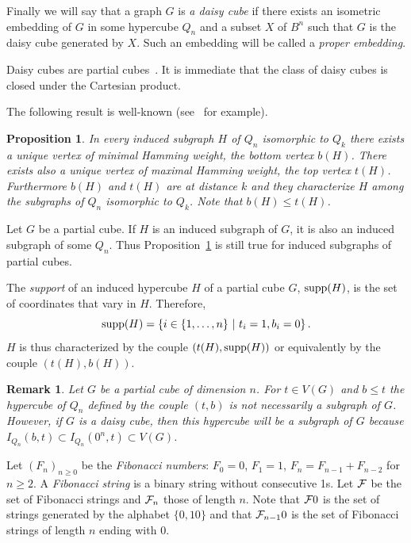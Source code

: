 \documentclass[11pt]{article}
\newtheorem{proposition}[theorem]{\bf Proposition}
\newtheorem{remark}[theorem]{\bf Remark}
\newcommand{\supp}{{\rm supp}}
\newcommand{\st}{ ~|~ }
\begin{document}
 Finally we will say that a graph $G$ is {\em a daisy cube} if there exists an isometric embedding  of $G$ in some hypercube $Q_n$ and a subset $X$ of $B^n$ such that $G$ is the daisy cube generated by $X$. Such an embedding will be called a {\em proper embedding}.

Daisy cubes are partial cubes~\cite{KM-2019a}. It is immediate that the class of daisy cubes is closed under the Cartesian product.

The following result is well-known (see~\cite{HIK-2011} for example).

\begin{proposition}\label{pro:bt}
In every induced subgraph $H$ of $Q_n$ isomorphic to $Q_k$ there exists a unique vertex of minimal Hamming weight, \emph{the bottom vertex} $b(H)$. There exists also a unique vertex of maximal Hamming weight, the \emph{top vertex} $t(H)$. 
Furthermore $b(H)$ and $t(H)$ are at distance $k$ and they characterize $H$ among the subgraphs of $Q_n$ isomorphic to $Q_k$. Note that $b(H) \le t(H)$. 
\end{proposition}

Let $G$ be a partial cube. If $H$ is an induced subgraph of $G$, it is also an induced subgraph of some $Q_n$. Thus Proposition~\ref{pro:bt} is still true for induced subgraphs of partial cubes.

The {\em support} of an induced hypercube $H$ of a partial cube  $G$, $\supp(H)$, is the set of coordinates that vary in $H$. Therefore, 
$$\supp(H) = \{i\in \{1,\ldots,n\}\st t_i=1, b_i=0\}\,.$$ 
$H$ is thus characterized by the couple $(t(H),\supp(H))$ or equivalently by the couple $(t(H),b(H))$. 
 \begin{remark}\label{re:daisy}
Let $G$ be a partial cube of dimension $n$. For $t\in V(G)$ and $b\leq t$  the hypercube of $Q_n$ defined by the couple $(t,b)$ is not necessarily a subgraph of $G$. However, if $G$ is a daisy cube, then this hypercube will be a subgraph of $G$ because $I_{Q_n}(b,t)\subset I_{Q_n}(0^n,t)\subset V(G)$. 
 \end{remark}


Let $(F_n)_{n\geq0}$ be the \emph{Fibonacci numbers}:
$F_0 = 0$, $F_1=1$, $F_{n} = F_{n-1} + F_{n-2}$ for $n\geq 2$.
A {\em Fibonacci string}  is a binary string without consecutive 1s. Let ${\cal F} $ be the set of Fibonacci strings and ${\cal F}_n$ those of length $n$.  Note that  ${\cal F} 0$  is the set of strings generated by the alphabet $\{0, 10\}$ and that ${\cal F}_{n-1} 0$ is the set of Fibonacci strings of length $n$ ending with $0$.
\end{document}
